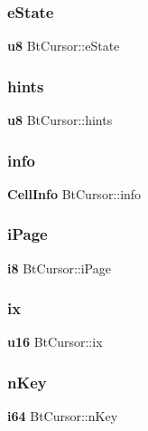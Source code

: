 \mbox{\label{struct_bt_cursor_a30ab5e7109965b34a08562a7b7e6de15}} 
\subsubsection{eState}
{\footnotesize\ttfamily \textbf{ u8} Bt\+Cursor\+::e\+State}

\mbox{\label{struct_bt_cursor_ad8c66c31cf1a2c2181d61a64ca951a8a}} 
\subsubsection{hints}
{\footnotesize\ttfamily \textbf{ u8} Bt\+Cursor\+::hints}

\mbox{\label{struct_bt_cursor_a9934b348c6e9f4808d8f98ea78788fbe}} 
\subsubsection{info}
{\footnotesize\ttfamily \textbf{ Cell\+Info} Bt\+Cursor\+::info}

\mbox{\label{struct_bt_cursor_adfe516b0ae2c030f5963fda944bf6d8e}} 
\subsubsection{iPage}
{\footnotesize\ttfamily \textbf{ i8} Bt\+Cursor\+::i\+Page}

\mbox{\label{struct_bt_cursor_a98bcbd9801b61e38b4a1a4442ad32ec5}} 
\subsubsection{ix}
{\footnotesize\ttfamily \textbf{ u16} Bt\+Cursor\+::ix}

\mbox{\label{struct_bt_cursor_a23f6a271258c109aaeda0ba19e808f92}} 
\subsubsection{nKey}
{\footnotesize\ttfamily \textbf{ i64} Bt\+Cursor\+::n\+Key}

\mbox{\label{struct_bt_cursor_a61c245712549192f7644e5ac23c00b74}} 
